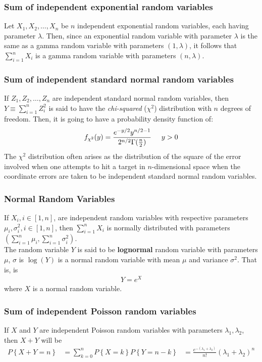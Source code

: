 \documentclass[a4paper]{article}
\begin{document}
\subsubsection{Sum of independent exponential random variables}
Let $X_1,X_2,\dots,X_n$ be $n$ independent exponential random variables, each having parameter $\lambda$. Then, since an exponential random variable with parameter $\lambda$ is the same as a gamma random variable with parameters $(1,\lambda)$, it follows that $\sum_{i=1}^{n}X_i$ is a gamma random variable with parameters $(n,\lambda)$.
\subsubsection{Sum of independent standard normal random variables}
If $Z_1,Z_2,\dots,Z_n$ are independent standard normal random variables, then $Y\equiv \sum_{i=1}^{n}Z_i^2$ is said to have the \emph{chi-squared} ($\chi^2$) distribution with $n$ degrees of freedom. Then, it is going to have a probability density function of:
\begin{align}
  f_{\chi^2}(y)= \frac{ e^{-y/2}y^{n/2-1}}{2^{n/2}\Gamma(\frac{n}{2})} \hspace{.5 cm} y > 0
\end{align}
The $\chi^2$ distribution often arises as the distribution of the square of the error involved when one attempts to hit a target in $n$-dimensional space when the coordinate errors are taken to be independent standard normal random variables.
\subsubsection{Normal Random Variables}
If $X_i,i \in [1,n]$, are independent random variables with respective parameters $\mu_i,\sigma_i^2,i\in[1,n]$, then $\sum_{i=1}^{n}X_i$ is normally distributed with parameters $(\sum_{i=1}^{n}\mu_i,\sum_{i=1}^{n}\sigma_i^2)$. \\
The random variable $Y$ is said to be {\bf lognormal} random variable with parameters $\mu$, $\sigma$ is $\log(Y)$ is a normal random variable with mean $\mu$ and variance $\sigma^2$. That is, is
\begin{align}
  Y=e^X
\end{align}
where $X$ is a normal random variable.
\subsubsection{Sum of independent Poisson random variables}
If $X$ and $Y$ are independent Poisson random variables with parameters $\lambda_1,\lambda_2$, then $X+Y$ will be
\begin{align}
  P\left\{ X+Y=n \right\} &= \sum_{k=0}^{n}P\left\{ X=k \right\}P\left\{ Y=n-k \right\}
  &= \frac{e^{-(\lambda_1+\lambda_2)}}{n!}(\lambda_1+\lambda_2)^n
\end{align}
\end{document}
